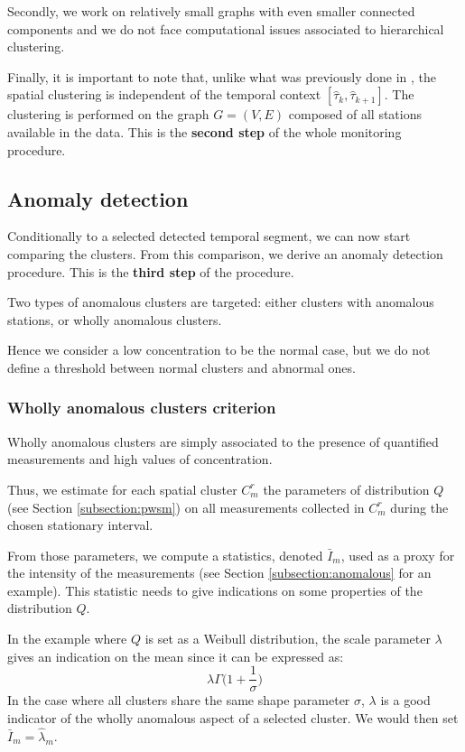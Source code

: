 Secondly, we work on relatively small graphs with even smaller connected components and we do not face computational issues associated to hierarchical clustering. 

Finally, it is important to note that, unlike what was previously done in \cite{Laroche2022}, the spatial clustering is independent of the temporal context $[\widehat{\tau}_k,\widehat{\tau}_{k+1}]$. The clustering is performed on the graph $G=(V,E)$ composed of all stations available in the data. This is the \textbf{second step} of the whole monitoring procedure.

\subsection{Anomaly detection}\label{section:anomaly}

Conditionally to a selected detected temporal segment, we can now start comparing the clusters. From this comparison, we derive an anomaly detection procedure. This is the \textbf{third step} of the procedure.   

Two types of anomalous clusters are targeted: either clusters with anomalous stations, or wholly anomalous clusters. 

Hence we consider a low concentration to be the normal case, but we do not define a threshold between normal clusters and abnormal ones. 


\subsubsection{Wholly anomalous clusters criterion}

Wholly anomalous clusters are simply associated to the presence of quantified measurements and high values of concentration. 

Thus, we estimate for each spatial cluster $C^r_m$ the parameters of distribution $Q$ (see Section \ref{subsection:pwsm}) on all measurements collected in $C^r_m$ during the chosen stationary interval. 

From those parameters, we compute a statistics, denoted $\bar{I}_m$, used as a proxy for the intensity of the measurements (see Section \ref{subsection:anomalous} for an example). This statistic needs to give indications on some properties of the distribution $Q$. 

In the example where $Q$ is set as a Weibull distribution, the scale parameter $\lambda$ gives an indication on the mean since it can be expressed as: 
\begin{equation}
\lambda\Gamma\bigg(1+\frac{1}{\sigma}\bigg)
\end{equation}
In the case where all clusters share the same shape parameter $\sigma$, $\lambda$ is a good indicator of the wholly anomalous aspect of a selected cluster. We would then set $\bar{I}_m = \widehat{\lambda}_m$.

